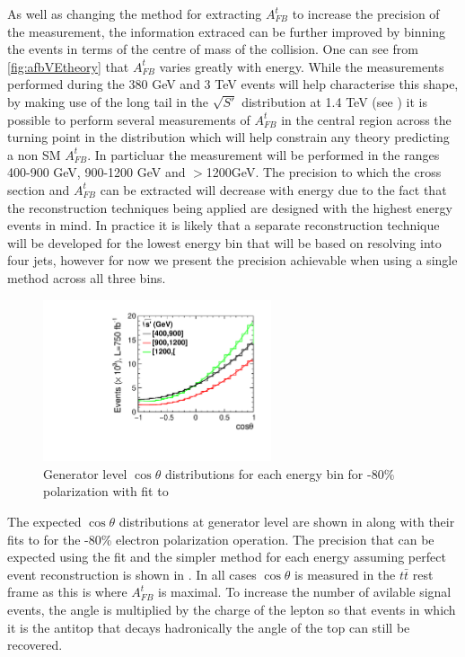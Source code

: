 As well as changing the method for extracting $A_{FB}^t$ to increase the precision of the measurement, the information extraced can be further improved by binning the events in terms of the centre of mass of the collision. One can see from \ref{fig:afbVEtheory} that $A_{FB}^t$ varies greatly with energy. While the measurements performed during the 380 GeV and 3 TeV events will help characterise this shape, by making use of the long tail in the $\sqrt{S'}$ distribution at 1.4 TeV (see ) it is possible to perform several measurements of $A_{FB}^t$ in the central region across the turning point in the distribution which will help constrain any theory predicting a non \ac{SM} $A_{FB}^t$. In particluar the measurement will be performed in the ranges 400-900 GeV, 900-1200 GeV and $>$1200GeV. The precision to which the cross section  and $A_{FB}^t$ can be extracted will decrease with energy due to the fact that the reconstruction techniques being applied are designed with the highest energy events in mind. In practice it is likely that a separate reconstruction technique will be developed for the lowest energy bin that will be based on resolving into four jets, however for now we present the precision achievable when using a single method across all three bins. 

\begin{figure}
  \centering
  \includegraphics[width=0.6\textwidth]{TopAnalysis/figures/GeneratorTheta.pdf}
  \caption[Generator level $\cos\theta$ distributions for each energy bin]{Generator level $\cos\theta$ distributions for each energy bin for -80\% polarization with fit to }
  \label{fig:mctheta}
\end{figure}

The expected $\cos\theta$ distributions at generator level are shown in  along with their fits to  for the -80\% electron polarization operation. The precision that can be expected using the fit and the simpler method for each energy assuming perfect event reconstruction is shown in . In all cases $\cos\theta$ is measured in the $t\bar{t}$ rest frame as this is where $A_{FB}^t$ is maximal. To increase the number of avilable signal events, the angle is multiplied by the charge of the lepton so that events in which it is the antitop that decays hadronically the angle of the top can still be recovered.

